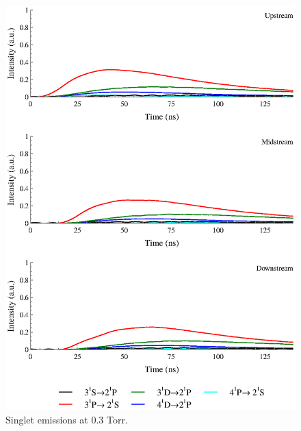\begin{figure}
  \centering
  \includegraphics{./chapters/extraem/figures/03torr_s.eps}
  \caption{Singlet emissions at 0.3 Torr.}
\end{figure}
